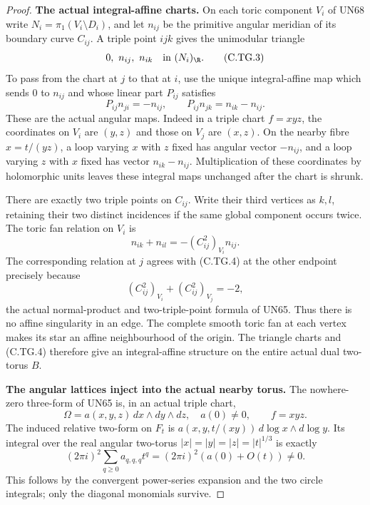 \begin{proof}
\par\medskip\noindent\textbf{The actual integral-affine charts.}
On each toric component $V_i$ of UN68 write
$N_i=\pi_1(V_i\setminus D_i)$, and let $n_{ij}$
be the primitive angular meridian of its boundary
curve $C_{ij}$. A triple point $ijk$ gives the
unimodular triangle
\[
                 0,\ n_{ij},\ n_{ik}\quad\hbox{in }(N_i)_{\R}.
\tag{C.TG.3}
\]
To pass from the chart at $j$ to that at $i$,
use the unique integral-affine map which sends
$0$ to $n_{ij}$ and whose linear part $P_{ij}$ satisfies
\[
 P_{ij}n_{ji}=-n_{ij},\qquad
 P_{ij}n_{jk}=n_{ik}-n_{ij}.
\tag{C.TG.4}
\]
These are the actual angular maps. Indeed in a
triple chart $f=xyz$, the coordinates on $V_i$
are $(y,z)$ and those on $V_j$ are $(x,z)$.
On the nearby fibre $x=t/(yz)$, a loop varying
$x$ with $z$ fixed has angular vector $-n_{ij}$,
and a loop varying $z$ with $x$ fixed has vector
$n_{ik}-n_{ij}$. Multiplication of these coordinates
by holomorphic units leaves these integral maps
unchanged after the chart is shrunk.

There are exactly two triple points on $C_{ij}$.
Write their third vertices as $k,l$, retaining
their two distinct incidences if the same global
component occurs twice. The toric fan relation on
$V_i$ is
\[
 n_{ik}+n_{il}=-(C_{ij}^2)_{V_i}n_{ij}.
\tag{C.TG.5}
\]
The corresponding relation at $j$ agrees with
(C.TG.4) at the other endpoint precisely because
\[
             (C_{ij}^2)_{V_i}+(C_{ij}^2)_{V_j}=-2,
\tag{C.TG.6}
\]
the actual normal-product and two-triple-point
formula of UN65. Thus there is no affine singularity
in an edge. The complete smooth toric fan at each
vertex makes its star an affine neighbourhood of
the origin. The triangle charts and (C.TG.4)
therefore give an integral-affine structure on
the entire actual dual two-torus $B$.

\par\medskip\noindent\textbf{The angular lattices inject into the actual nearby torus.}
The nowhere-zero three-form of UN65 is, in an
actual triple chart,
\[
       \Omega=a(x,y,z)\,dx\wedge dy\wedge dz,
          \quad a(0)\ne0,
          \qquad f=xyz.
\tag{C.TG.7}
\]
The induced relative two-form on $F_t$ is
$a(x,y,t/(xy))\,d\log x\wedge d\log y$.
Its integral over the real angular two-torus
$|x|=|y|=|z|=|t|^{1/3}$ is exactly
\[
 (2\pi i)^2\sum_{q\ge0}a_{q,q,q}t^q
                  =(2\pi i)^2(a(0)+O(t))\ne0.
\tag{C.TG.8}
\]
This follows by the convergent power-series expansion
and the two circle integrals; only the diagonal
monomials survive.


\end{proof}
